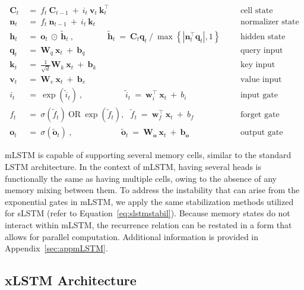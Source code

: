 \begin{align}
\label{eq:mlstm_recurrent_begin}
\mathbf{C}_t \ &= \  f_t \ \mathbf{C}_{t-1} \ + \ 
  i_t \ \mathbf{v}_t \ \mathbf{k}_t^\top & &  &\text{cell state} \\
\mathbf{n}_t \ &= \  f_t \ \mathbf{n}_{t-1} \ + \ 
  i_t \ \mathbf{k}_t & &  &\text{normalizer state} \\
\mathbf{h}_t  \ &= \ \mathbf{o}_t \ \odot \ \tilde{\mathbf{h}}_t
\ , \qquad \qquad 
\tilde{\mathbf{h}}_t \ = \   \mathbf{C}_t \mathbf{q}_t \ / \ 
  \max \left\{ |\mathbf{n}_t^\top \mathbf{q}_t|, 1 \right\} 
   &&&\text{hidden state} \\
\mathbf{q}_t \ &= \ \mathbf{W}_q \ \mathbf{x}_t \ + \ \mathbf{b}_q  & &  &\text{query input} \\
\mathbf{k}_t \ &= \ \frac{1}{\sqrt{d}} \mathbf{W}_k \ \mathbf{x}_t \ + \ \mathbf{b}_k  & &  &\text{key input} \\
\mathbf{v}_t \ &= \ \mathbf{W}_v \ \mathbf{x}_t \ + \ \mathbf{b}_v  & &  &\text{value input} \\
i_t \ &= \ \!\exp \!  \! \left( \tilde{i}_t  \right) \ , 
 \qquad \qquad \ \ \ \ \,
  \tilde{i}_t \ = \ \mathbf{w}^\top_{i} \ \mathbf{x}_t \ + \  b_{i} \ \ \ 
  &&&\text{input gate} \\
f_t \ &= \ \sigma \!  \left(  \tilde{f}_t \right) \ \text{OR} \ \!\exp \!  \! \left(  \tilde{f}_t \right) , \ \ \: \!
\tilde{f}_t \ = \ \mathbf{w}^\top_{f} \ \mathbf{x}_t  \ + \
  b_{f}
  &&& \text{forget gate} \\
\label{eq:mlstm_recurrent_end}
\mathbf{o}_t \ &= \ \sigma \left( \tilde{\mathbf{o}}_t \right) \ , \qquad \qquad \quad \ \ \ \,
  \tilde{\mathbf{o}}_t  \ = \ \mathbf{W}_{\mathbf{o}} \ \mathbf{x}_t \ + \
  \mathbf{b}_{\mathbf{o}}
  &&&\text{output gate} 
\end{align}

mLSTM is capable of supporting several memory cells, similar to the standard LSTM architecture. In the context of mLSTM, having several heads is functionally the same as having multiple cells, owing to the absence of any memory mixing between them. To address the instability that can arise from the exponential gates in mLSTM, we apply the same stabilization methods utilized for sLSTM (refer to Equation~\ref{eq:slstmstabil}).  
Because memory states do not interact within mLSTM, the recurrence relation can be restated in a form that allows for parallel computation. Additional information is provided in Appendix~\ref{sec:appmLSTM}.

\subsection{xLSTM Architecture}
\label{sec:xLSTMarch}

